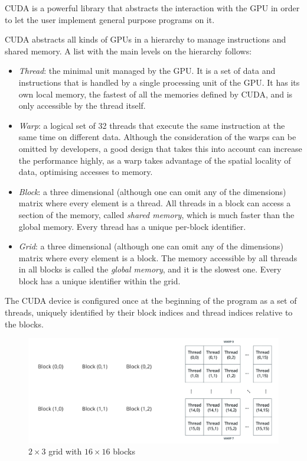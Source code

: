 \ac{CUDA} is a powerful library that abstracts the interaction with the \ac{GPU} in order to let the user implement general purpose programs on it.

\ac{CUDA} abstracts all kinds of \acp{GPU} in a hierarchy to manage instructions and shared memory. A list with the main levels on the hierarchy follows:
\begin{itemize}
	\item \emph{Thread}: the minimal unit managed by the \ac{GPU}. It is a set of data and instructions that is handled by a single processing unit of the \ac{GPU}. It has its own local memory, the fastest of all the memories defined by \ac{CUDA}, and is only accessible by the thread itself.
	\item \emph{Warp}: a logical set of 32 threads that execute the same instruction at the same time on different data. Although the consideration of the warps can be omitted by developers, a good design that takes this into account can increase the performance highly, as a warp takes advantage of the spatial locality of data, optimising accesses to memory.
	\item \emph{Block}: a three dimensional (although one can omit any of the dimensions) matrix where every element is a thread. All threads in a block can access a section of the memory, called \emph{shared memory}, which is much faster than the global memory. Every thread has a unique per-block identifier.
	\item \emph{Grid}: a three dimensional (although one can omit any of the dimensions) matrix where every element is a block. The memory accessible by all threads in all blocks is called the \emph{global memory}, and it is the slowest one. Every block has a unique identifier within the grid.
\end{itemize}

The \ac{CUDA} device is configured once at the beginning of the program as a set of threads, uniquely identified by their block indices and thread indices relative to the blocks.

\begin{figure}[bth]
	\myfloatalign
	\includegraphics[width=.8\linewidth]{gfx/cudagrid}
	\caption[$2\times3$ grid with $16\times16$ blocks]{$2\times3$ grid with $16\times16$ blocks}
	\label{fig:cudagrid}
\end{figure}

